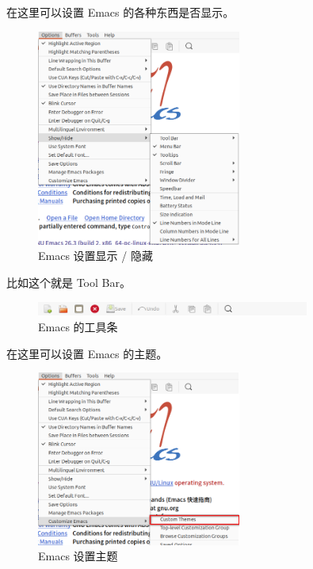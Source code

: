\documentclass[UTF-8]{ctexart}
\begin{document}
				在这里可以设置 Emacs 的各种东西是否显示。
				
				\begin{figure}[H]
					\centering
					\includegraphics[width=0.6\textwidth]{fig/emacs_show_hide.png}
					\caption*{Emacs 设置显示 / 隐藏}
				\end{figure}
			
				比如这个就是 Tool Bar。
				
				\begin{figure}[H]
					\centering
					\includegraphics[width=0.8\textwidth]{fig/emacs_toolbar.png}
					\caption*{Emacs 的工具条}
				\end{figure}
			
				在这里可以设置 Emacs 的主题。
				
				\begin{figure}[H]
					\centering
					\includegraphics[width=0.6\textwidth]{fig/emacs_themes.png}
					\caption*{Emacs 设置主题}
				\end{figure}
				
\end{document}
